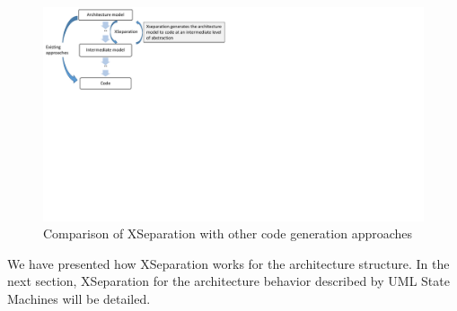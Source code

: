 \begin{figure}
	\centering
	\includegraphics[clip, trim=0cm 11.3cm 17.6cm 0cm, width=\columnwidth]{figures/transformationchain.pdf}
	\caption{Comparison of XSeparation with other code generation approaches} 
	\label{fig:transformationchain}
\end{figure}




We have presented how XSeparation works for the architecture structure.
In the next section, XSeparation for the architecture behavior described by UML State Machines will be detailed.